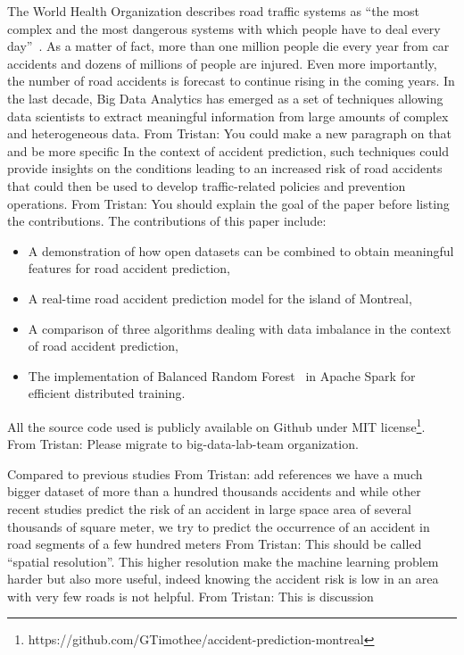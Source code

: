 \documentclass[conference]{IEEEtran}
\newcommand{\todo}[1]{\colorlet{saved}{.}\color{blue}#1\color{saved}}
\newcommand{\TG}[1]{\colorlet{saved}{.}\color{orange}From Tristan: #1\color{saved}}
\begin{document}
The World Health Organization describes road traffic systems as “the most
complex and the most dangerous systems with which people have to deal every
day”~\cite{Peden2004}. As a matter of fact, more than one million people
die every year from car accidents and dozens of millions of people are
injured. Even more importantly, the number of road accidents is forecast to
continue rising in the coming years. In the last decade, Big Data Analytics
has emerged as a set of techniques allowing data scientists to extract
meaningful information from large amounts of complex and heterogeneous
data. \TG{You could make a new paragraph on that and be more specific} In the context of accident prediction, such techniques could provide
insights on the conditions leading to an increased risk of road accidents
that could then be used to develop traffic-related policies and prevention
operations. \TG{You should explain the goal of the paper before listing the contributions.} The contributions of this paper include: 
\begin{itemize}
\item A demonstration of how open datasets can be combined to obtain
meaningful features for road accident prediction,
\item A real-time road accident prediction model for the island of Montreal,
\item A comparison of three algorithms dealing with data imbalance in the context of road accident prediction,
\item The implementation of Balanced Random Forest~\cite{Chen2004} in Apache Spark for efficient distributed training.
\end{itemize}

All the source code used is publicly available on Github under MIT
license\footnote{https://github.com/GTimothee/accident-prediction-montreal}.
\TG{Please migrate to big-data-lab-team organization.}

\todo{
  Compared to previous studies \TG{add references} we have a much bigger dataset of more
  than a hundred thousands accidents and while other recent studies predict
  the risk  of an accident in large space area of several thousands of
  square meter, we try to predict the occurrence of an accident in road
  segments of a few hundred meters \TG{This should be called ``spatial resolution''}. This higher resolution make the machine
  learning problem harder but also more useful, indeed knowing the accident
  risk is low in an area with very few roads is not helpful.  \TG{This is discussion}
  } \color{black}
\end{document}
